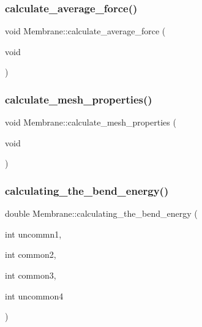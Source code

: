 \mbox{\label{classMembrane_a696ec76d17d33335f2c41aa498485e56}} 
\subsubsection{\texorpdfstring{calculate\_average\_force()}{calculate\_average\_force()}}
{\footnotesize\ttfamily void Membrane\+::calculate\+\_\+average\+\_\+force (\begin{DoxyParamCaption}\item[{void}]{ }\end{DoxyParamCaption})\hspace{0.3cm}{\ttfamily [inline]}}

\mbox{\label{classMembrane_adb71eee849f346efcd7303241a3469c2}} 
\subsubsection{\texorpdfstring{calculate\_mesh\_properties()}{calculate\_mesh\_properties()}}
{\footnotesize\ttfamily void Membrane\+::calculate\+\_\+mesh\+\_\+properties (\begin{DoxyParamCaption}\item[{void}]{ }\end{DoxyParamCaption})}

\mbox{\label{classMembrane_a33fc180494ab51246289b0b2070fb177}} 
\subsubsection{\texorpdfstring{calculating\_the\_bend\_energy()}{calculating\_the\_bend\_energy()}}
{\footnotesize\ttfamily double Membrane\+::calculating\+\_\+the\+\_\+bend\+\_\+energy (\begin{DoxyParamCaption}\item[{int}]{uncommn1,  }\item[{int}]{common2,  }\item[{int}]{common3,  }\item[{int}]{uncommon4 }\end{DoxyParamCaption})}

